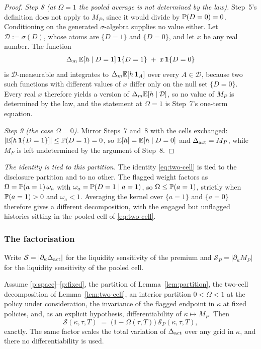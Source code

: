 \begin{proof}
\emph{Step 8 (at $\Omega = 1$ the pooled average is not determined by the law).} Step~5's definition
does not apply to $M_P$, since it would divide by $\mathbb{P}(D = 0) = 0$. Conditioning on the generated
$\sigma$-algebra supplies no value either. Let $\mathcal D := \sigma(D)$, whose atoms are
$\{D = 1\}$ and $\{D = 0\}$, and let $x$ be any real number. The function
\begin{equation}
\label{eq:version}
  \Delta_m\,\mathbb{E}[h \mid D = 1]\,\mathbf{1}\{D = 1\} \;+\; x\,\mathbf{1}\{D = 0\}
\end{equation}
is $\mathcal D$-measurable and integrates to $\Delta_m\mathbb{E}[h\,\mathbf{1}_A]$ over every
$A \in \mathcal D$, because two such functions with different values of $x$ differ only on the null
set $\{D = 0\}$. Every real $x$ therefore yields a version of $\Delta_m\mathbb{E}[h \mid \mathcal D]$, so
no value of $M_P$ is determined by the law, and the statement at $\Omega = 1$ is Step~7's one-term
equation.

\emph{Step 9 (the case $\Omega = 0$).} Mirror Steps~7 and~8 with the cells exchanged:
$|\mathbb{E}[h\,\mathbf{1}\{D = 1\}]| \le \mathbb{P}(D = 1) = 0$, so $\mathbb{E}[h] = \mathbb{E}[h \mid D = 0]$ and
$\Delta_{\mathrm{act}} = M_P$, while $M_F$ is left undetermined by the argument of Step~8.
\end{proof}

\medskip
\noindent\emph{The identity is tied to this partition.} The identity \eqref{eq:two-cell} is tied to the disclosure partition and to no other. The flagged
weight factors as $\Omega = \mathbb{P}(a = 1)\,\omega_a$ with $\omega_a = \mathbb{P}(D = 1 \mid a = 1)$, so
$\Omega \le \mathbb{P}(a = 1)$, strictly when $\mathbb{P}(a = 1) > 0$ and $\omega_a < 1$. Averaging the kernel
over $\{a = 1\}$ and $\{a = 0\}$ therefore gives a different decomposition, with the engaged but
unflagged histories sitting in the pooled cell of \eqref{eq:two-cell}.
\medskip

\subsubsection*{The factorisation}

Write $\mathcal S = |\partial_\kappa \Delta_{\mathrm{act}}|$ for the liquidity sensitivity of the premium and
$\mathcal S_P = |\partial_\kappa M_P|$ for the liquidity sensitivity of the pooled cell.

\begin{proposition}
\label{prop:factorisation}
Assume \ref{p:space}--\ref{p:fixed}, the partition of Lemma~\ref{lem:partition}, the two-cell
decomposition of Lemma~\ref{lem:two-cell}, an interior partition $0 < \Omega < 1$ at the policy under
consideration, the invariance of the flagged endpoint in $\kappa$ at fixed policies, and, as an
explicit hypothesis, differentiability of $\kappa \mapsto M_P$. Then
\begin{equation}
\label{eq:factorisation}
  \mathcal S(\kappa,\tau,T) \;=\; \bigl(1 - \Omega(\tau,T)\bigr)\,\mathcal S_P(\kappa,\tau,T),
\end{equation}
exactly. The same factor scales the total variation of $\Delta_{\mathrm{act}}$ over any grid in $\kappa$, and there
no differentiability is used.
\end{proposition}


